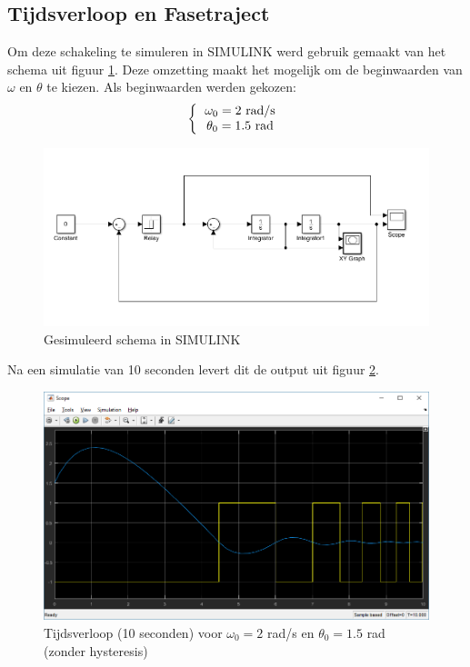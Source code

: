\documentclass[12pt]{article}
\begin{document}
\subsection{Tijdsverloop en Fasetraject}
Om deze schakeling te simuleren in SIMULINK werd gebruik gemaakt van het schema uit figuur \ref{simulinkschema}. Deze omzetting maakt het mogelijk om de beginwaarden van $\omega$ en $\theta$ te kiezen. Als beginwaarden werden gekozen:
\[ 
\left \{
  \begin{tabular}{c}
  $\omega_0 = 2$ rad/s \\
  $\theta_0 = 1.5$ rad
  \end{tabular}
\right. 
\]
\begin{figure}
	\centering
	\includegraphics[width=\textwidth, keepaspectratio]{simulinkschema.png}
	\caption{Gesimuleerd schema in SIMULINK}
	\label{simulinkschema}
\end{figure}
Na een simulatie van 10 seconden levert dit de output uit figuur \ref{output1}.
\begin{figure}
	\centering
	\includegraphics[width=\textwidth, keepaspectratio]{output1.png}
	\caption{Tijdsverloop (10 seconden) voor $\omega_0 = 2$ rad/s en $\theta_0 = 1.5$ rad (zonder hysteresis)}
	\label{output1}
\end{figure}
\end{document}
